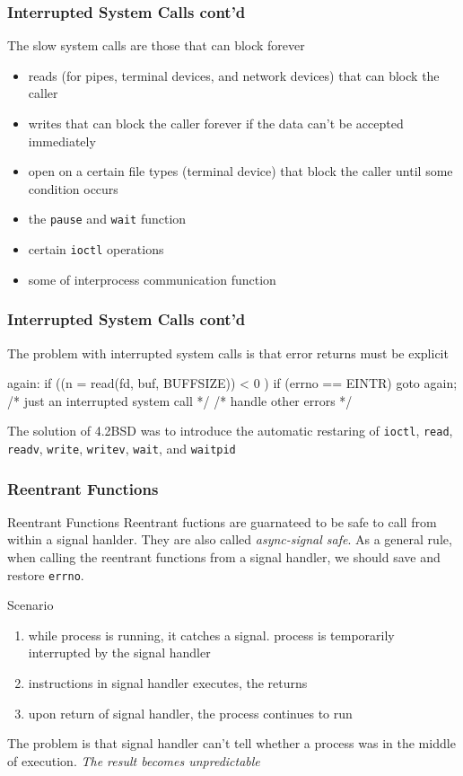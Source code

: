 \documentclass[newPxFont,sthlmFooter,nooffset]{beamer}
\begin{document}
\begin{frame}[t]
  \frametitle{Interrupted System Calls cont'd}
The slow system calls are those that can block forever
\begin{itemize}
\item reads (for pipes, terminal devices, and network devices) that can block the caller
\item writes that can block the caller forever if the data can't be accepted immediately
\item open on a certain file types (terminal device) that block the caller until some condition occurs
\item the \texttt{pause} and \texttt{wait} function
\item certain \texttt{ioctl} operations
\item some of interprocess communication function
\end{itemize}

\end{frame}

\begin{frame}[fragile,t]
  \frametitle{Interrupted System Calls cont'd}
The problem with interrupted system calls is that error returns must be explicit

\begin{codedef}
again:
    if ((n = read(fd, buf, BUFFSIZE)) < 0 ) {
        if (errno == EINTR)
            goto again; /* just an interrupted system call */
        /* handle other errors */
    }
\end{codedef}

The solution of 4.2BSD was to introduce the automatic restaring of \texttt{ioctl}, \texttt{read}, \texttt{readv}, \texttt{write}, \texttt{writev}, \texttt{wait}, and \texttt{waitpid}

\end{frame}



\begin{frame}[fragile,t]
  \frametitle{Reentrant Functions}
\begin{block}{Reentrant Functions}
Reentrant fuctions are guarnateed to be safe to call from within a signal hanlder.   They are also called \textit{async-signal safe}. As a general rule, when calling the reentrant  functions from a signal handler, we should save and restore \texttt{errno}.
\end{block}

 {Scenario}
\begin{enumerate}
\item <2-> while process is running, it catches a signal. process is temporarily interrupted by the signal handler
\item <3-> instructions in signal handler executes, the returns
\item <4-> upon return of signal handler, the process continues to run
\end{enumerate}

 {The problem is that signal handler can't tell whether a process was in the middle of execution. \textit{The result becomes unpredictable}}
\end{frame}
\end{document}
